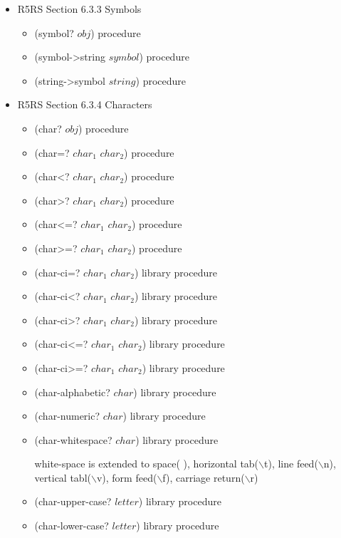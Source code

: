 \documentclass{article}
\begin{document}
\begin{itemize}
\item R5RS Section 6.3.3 Symbols
	\begin{itemize}
		\item (symbol? $obj$)	\hfill	procedure
		\item (symbol->string $symbol$)	\hfill	procedure
		\item (string->symbol $string$)	\hfill	procedure
	\end{itemize}
	
\item R5RS Section 6.3.4 Characters
	\begin{itemize}
		\item (char? $obj$)	\hfill	procedure
		
		\item (char=? $char_1$ $char_2$)	\hfill	procedure
		\item (char<? $char_1$ $char_2$)	\hfill	procedure
		\item (char>? $char_1$ $char_2$)	\hfill	procedure
		\item (char<=? $char_1$ $char_2$)	\hfill	procedure
		\item (char>=? $char_1$ $char_2$)	\hfill	procedure
		
		\item (char-ci=? $char_1$ $char_2$)	\hfill	library procedure
		\item (char-ci<? $char_1$ $char_2$)	\hfill	library procedure
		\item (char-ci>? $char_1$ $char_2$)	\hfill	library procedure
		\item (char-ci<=? $char_1$ $char_2$)	\hfill	library procedure
		\item (char-ci>=? $char_1$ $char_2$)	\hfill	library procedure
		
		\item (char-alphabetic? $char$)	\hfill	library procedure
		\item (char-numeric? $char$)	\hfill	library procedure
		\item (char-whitespace? $char$)	\hfill	library procedure
		
		white-space is extended to space( ), horizontal tab($\backslash$t), line feed($\backslash$n), vertical tabl($\backslash$v), form feed($\backslash$f), carriage return($\backslash$r)
		
		\item (char-upper-case? $letter$)	\hfill	library procedure
		\item (char-lower-case? $letter$)	\hfill	library procedure
		

\end{itemize}
\end{itemize}
\end{document}
